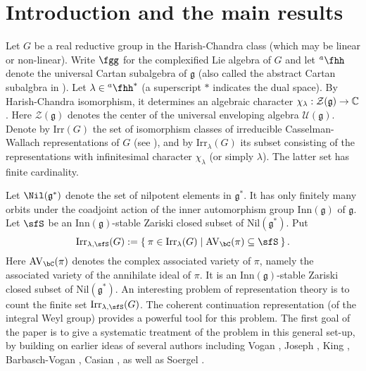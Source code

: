 \documentclass[12pt,a4paper]{amsart}
\newcommand{\AVC}{\mathrm{AV}_\bC}
\def\subset{\subseteq}
\newcommand{\CZ}{{\mathcal {Z}}}
\newcommand{\g}{\mathfrak g}
\numberwithin{equation}{section}
\theoremstyle{remark}
\def\Irr{\mathrm{Irr}}
\def\hha{{}^a\fhh}
\begin{document}
\maketitle



\tableofcontents



\section{Introduction and the main results}\label{sec:intro}

Let $G$ be a real reductive group in the Harish-Chandra class (which may be
linear or non-linear). Write $\fgg$ for the complexified Lie algebra of $G$ and
let $\hha$ denote the universal Cartan subalgebra of $\g$ (also called the abstract Cartan subalgbra in \cite{V4}).
Let $\lambda \in \hha^*$ (a superscript $*$ indicates the dual space). By Harish-Chandra isomorphism, it
determines an algebraic character $\chi_\lambda: \CZ(\g)\rightarrow \C$. Here
$\CZ(\g)$ denotes the center of the universal enveloping algebra
$\mathcal U(\g)$. Denote by $\Irr(G)$ the set of isomorphism classes of
irreducible Casselman-Wallach representations of $G$ (see \cite[Chapter 11]{Wa2}), and by $\Irr_\lambda(G)$
its subset consisting of the representations with infinitesimal character
$\chi_\lambda$ (or simply $\lambda$). The latter set has finite cardinality.


Let $\Nil(\g^*)$ denote the set of nilpotent elements in $\g^*$. It has only
finitely many orbits under the coadjoint action of the inner automorphism group
$\mathrm{Inn}(\g)$ of $\g$. Let $\sfS$ be an $\mathrm{Inn}(\g)$-stable Zariski
closed subset of $\mathrm{Nil}(\g^*)$. Put
\[
  \Irr_{\lambda,\sfS}(G):=\Set{\pi \in \Irr_{\lambda}(G)| \text{$\AVC(\pi)\subset \sfS$} }.
\]
Here $\AVC(\pi)$ denotes the complex associated variety of $\pi$, namely the
associated variety of the annihilate ideal of $\pi$. It is an
$\mathrm{Inn}(\g)$-stable Zariski closed subset of $\mathrm{Nil}(\g^*)$. An
interesting problem of representation theory is to count the finite set $\Irr_{\lambda,\sfS}(G)$. The coherent continuation
representation (of the integral Weyl group) provides a powerful tool for this problem. The first goal of the paper is to give a systematic treatment of the problem in this general set-up, by building on earlier ideas of several authors including Vogan \cite{Vg}, Joseph \cite{J1,J2},  King \cite{King}, Barbasch-Vogan \cite{BVUni}, Casian \cite{Cas}, as well as Soergel \cite{Soergel}.
\end{document}

